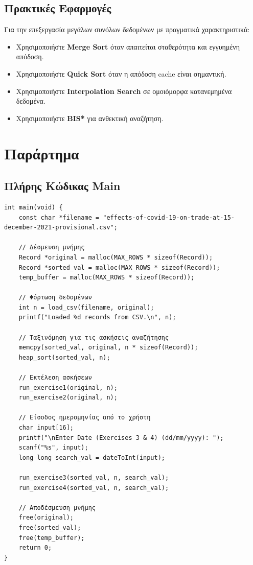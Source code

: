 \documentclass[a4paper,12pt]{article}
\begin{document}
	\subsection{Πρακτικές Εφαρμογές}
	
	Για την επεξεργασία μεγάλων συνόλων δεδομένων με πραγματικά χαρακτηριστικά:
	
	\begin{itemize}
		\item Χρησιμοποιήστε \textbf{Merge Sort} όταν απαιτείται σταθερότητα και εγγυημένη απόδοση.
		\item Χρησιμοποιήστε \textbf{Quick Sort} όταν η απόδοση cache είναι σημαντική.
		\item Χρησιμοποιήστε \textbf{Interpolation Search} σε ομοιόμορφα κατανεμημένα δεδομένα.
		\item Χρησιμοποιήστε \textbf{BIS*} για ανθεκτική αναζήτηση.
	\end{itemize}
	
	\newpage
	\section{Παράρτημα}
	
	\subsection{Πλήρης Κώδικας Main}
	
	\begin{lstlisting}[caption=Πλήρης υλοποίηση main()]
int main(void) {
	const char *filename = "effects-of-covid-19-on-trade-at-15-december-2021-provisional.csv";
	
	// Δέσμευση μνήμης
	Record *original = malloc(MAX_ROWS * sizeof(Record));
	Record *sorted_val = malloc(MAX_ROWS * sizeof(Record));
	temp_buffer = malloc(MAX_ROWS * sizeof(Record));
	
	// Φόρτωση δεδομένων
	int n = load_csv(filename, original);
	printf("Loaded %d records from CSV.\n", n);
	
	// Ταξινόμηση για τις ασκήσεις αναζήτησης
	memcpy(sorted_val, original, n * sizeof(Record));
	heap_sort(sorted_val, n);
	
	// Εκτέλεση ασκήσεων
	run_exercise1(original, n);
	run_exercise2(original, n);
	
	// Είσοδος ημερομηνίας από το χρήστη
	char input[16];
	printf("\nEnter Date (Exercises 3 & 4) (dd/mm/yyyy): ");
	scanf("%s", input);
	long long search_val = dateToInt(input);
	
	run_exercise3(sorted_val, n, search_val);
	run_exercise4(sorted_val, n, search_val);
	
	// Αποδέσμευση μνήμης
	free(original);
	free(sorted_val);
	free(temp_buffer);
	return 0;
}
	\end{lstlisting}
	
\end{document}
